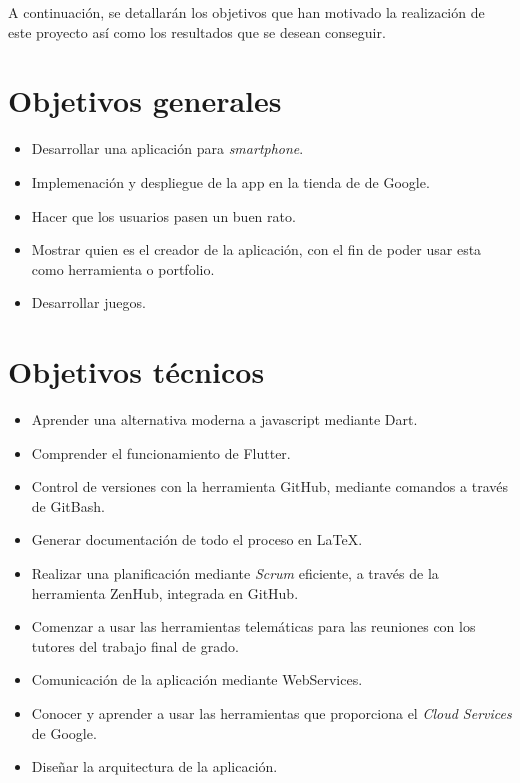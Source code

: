 

A continuación, se detallarán los objetivos que han motivado la realización de este proyecto así como los resultados que se desean conseguir.

\section{Objetivos generales}
\begin{itemize}
	\item Desarrollar una aplicación para \emph{smartphone}.
	\item Implemenación y despliegue de la app en la tienda de de Google.
	\item Hacer que los usuarios pasen un buen rato.
	\item Mostrar quien es el creador de la aplicación, con el fin de poder usar esta como herramienta o portfolio.
	\item Desarrollar juegos.
\end{itemize}

\section{Objetivos técnicos}
\begin{itemize}
	\item Aprender una alternativa moderna a javascript mediante Dart.
	\item Comprender el funcionamiento de Flutter.
	\item Control de versiones con la herramienta GitHub, mediante comandos a través de GitBash.
	\item Generar documentación de todo el proceso en \LaTeX.
	\item Realizar una planificación mediante \emph{Scrum} eficiente, a través de la herramienta ZenHub, integrada en GitHub.
	\item Comenzar a usar las herramientas telemáticas para las reuniones con los tutores del trabajo final de grado. 
	\item Comunicación de la aplicación mediante WebServices.
	\item Conocer y aprender a usar las herramientas que proporciona el \emph{Cloud Services} de Google.
	\item Diseñar la arquitectura de la aplicación.
	
\end{itemize}

